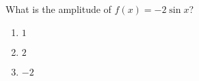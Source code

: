 
\bigskip

\item What is the amplitude of $f(x) = -2\sin x$?
	
	\begin{enumerate}
		\item $1$
		\item $2$
		\item $-2$
	\end{enumerate}
	

